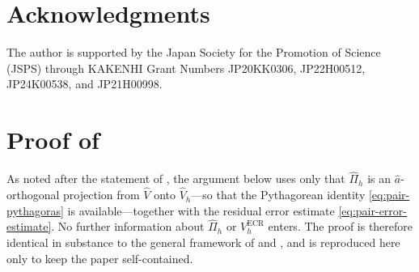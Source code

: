 \documentclass[11pt]{article}
\theoremstyle{plain}
\theoremstyle{definition}
\theoremstyle{remark}
\newcommand{\ECR}{\mathrm{ECR}}
\begin{document}
\section*{Acknowledgments}
The author is supported by the Japan Society for the Promotion
of Science (JSPS) through KAKENHI Grant Numbers JP20KK0306,
JP22H00512, JP24K00538, and JP21H00998.


\appendix
\section{Proof of \texorpdfstring{}%
                  {Theorem~\ref{thm:cecr-abstract}}}
\label{app:cecr-abstract-proof}

As noted after the statement of , the
argument below uses only that $\widehat\Pi_h$ is an
$\widehat a$-orthogonal projection from $\widehat V$ onto
$\widehat V_h$---so that the Pythagorean identity
\eqref{eq:pair-pythagoras} is available---together with the
residual error estimate \eqref{eq:pair-error-estimate}. No
further information about $\widehat\Pi_h$ or $V_h^{\ECR}$ enters.
The proof is therefore identical in substance to the general
framework of \cite[Theorem~2.1]{Liu2015} and
\cite[Theorem~4.1]{liu2024guaranteed}, and is reproduced here
only to keep the paper self-contained.
\end{document}
